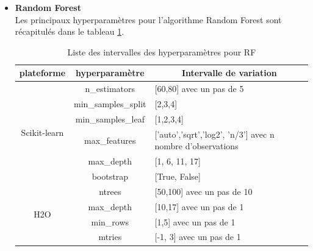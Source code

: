 \begin{itemize}
    \item[\ding{233}]\textbf{Random Forest}\\%
        Les principaux hyperparamètres pour l'algorithme Random Forest sont récapitulés dans le tableau \ref{tab:HP-RF-OP}.\\
        
        \begin{table}[h!]
        \centering
        \begin{tabular}{|c|c|p{7cm}p{0.2cm}|}
        \hline
        plateforme & hyperparamètre &\multicolumn{2}{|c|}{Intervalle de variation}  \\ \hline
        \multirow{6}{*}{Scikit-learn} 
        & n\_estimators &  [60,80] avec un pas de 5 &\\
        & min\_samples\_split & [2,3,4] &\\ 
        & min\_samples\_leaf & [1,2,3,4] &\\
        & max\_features & ['auto','sqrt','log2', 'n/3'] avec n nombre d'observations &\\
        & max\_depth & [1, 6, 11, 17] &\\
        & bootstrap & [True, False] &\\
         \hline
        \multirow{6}{*}{H2O} 
        & ntrees &  [50,100] avec un pas de 10 &\\
        & max\_depth & [10,17] avec un pas de 1  &\\
        & min\_rows & [1,5] avec un pas de 1 &\\
        & mtries & [-1, 3] avec un pas de 1 &\\
         \hline
        \end{tabular}
        \caption{Liste des intervalles des hyperparamètres pour RF\\}
        \label{tab:HP-RF-OP}
        \end{table}
        

\end{itemize}
